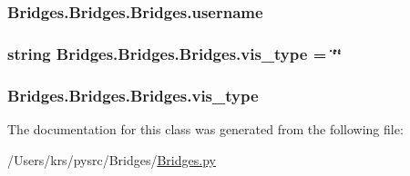 \subsubsection[{username}]{\setlength{\rightskip}{0pt plus 5cm}Bridges.\+Bridges.\+Bridges.\+username}\label{class_bridges_1_1_bridges_1_1_bridges_a65b7ea93a38533a0f875e5f3e5d80caf}
\hypertarget{class_bridges_1_1_bridges_1_1_bridges_a27bc30c5de41aa3495c25ad7ee9a07f7}{}
\subsubsection[{vis\+\_\+type}]{\setlength{\rightskip}{0pt plus 5cm}string Bridges.\+Bridges.\+Bridges.\+vis\+\_\+type = \char`\"{}\char`\"{}\hspace{0.3cm}{\ttfamily [static]}}\label{class_bridges_1_1_bridges_1_1_bridges_a27bc30c5de41aa3495c25ad7ee9a07f7}
\hypertarget{class_bridges_1_1_bridges_1_1_bridges_aea9edc834f1fc1dcfb1ca53d82eba33a}{}
\subsubsection[{vis\+\_\+type}]{\setlength{\rightskip}{0pt plus 5cm}Bridges.\+Bridges.\+Bridges.\+vis\+\_\+type}\label{class_bridges_1_1_bridges_1_1_bridges_aea9edc834f1fc1dcfb1ca53d82eba33a}


The documentation for this class was generated from the following file\+:\begin{DoxyCompactItemize}
\item 
/\+Users/krs/pysrc/\+Bridges/\hyperlink{_bridges_8py}{Bridges.\+py}\end{DoxyCompactItemize}
